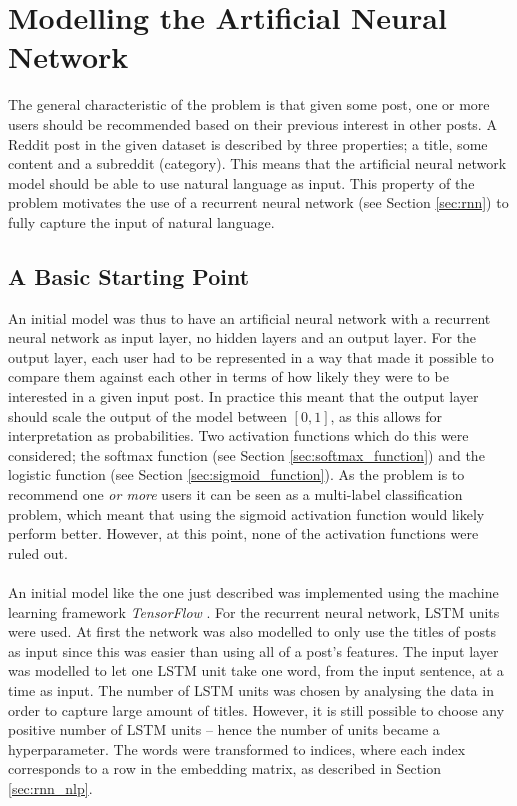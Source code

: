 \section{Modelling the Artificial Neural Network}\label{sec:modelling_the_ann}
The general characteristic of the problem is that given some post, one or more users should be recommended based on their previous interest in other posts. A Reddit post in the given dataset is described by three properties; a title, some content and a subreddit (category). This means that the artificial neural network model should be able to use natural language as input. This property of the problem motivates the use of a recurrent neural network (see Section \ref{sec:rnn}) to fully capture the input of natural language. 

\subsection{A Basic Starting Point}\label{method_basic_start_point}
An initial model was thus to have an artificial neural network with a recurrent neural network as input layer, no hidden layers and an output layer. For the output layer, each user had to be represented in a way that made it possible to compare them against each other in terms of how likely they were to be interested in a given input post. In practice this meant that the output layer should scale the output of the model between $[0,1]$, as this allows for interpretation as probabilities. Two activation functions which do this were considered; the softmax function (see Section \ref{sec:softmax_function}) and the logistic function (see Section \ref{sec:sigmoid_function}). As the problem is to recommend one \textit{or more} users it can be seen as a multi-label classification problem, which meant that using the sigmoid activation function would likely perform better. However, at this point, none of the activation functions were ruled out.
\\\\
An initial model like the one just described was implemented using the machine learning framework \textit{TensorFlow} \parencite{tensorflow2015whitepaper}. For the recurrent neural network, LSTM units were used. At first the network was also modelled to only use the titles of posts as input since this was easier than using all of a post's features. The input layer was modelled to let one LSTM unit take one word, from the input sentence, at a time as input. The number of LSTM units was chosen by analysing the data in order to capture large amount of titles. However, it is still possible to choose any positive number of LSTM units -- hence the number of units became a hyperparameter. The words were transformed to indices, where each index corresponds to a row in the embedding matrix, as described in Section \ref{sec:rnn_nlp}.
